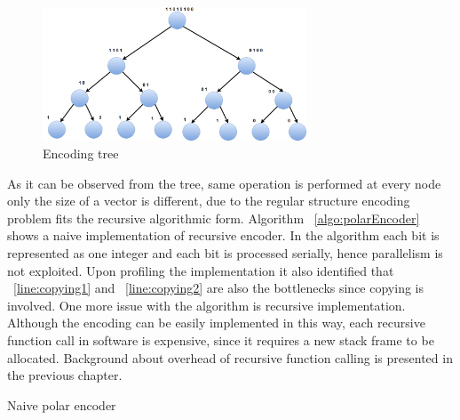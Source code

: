 \begin{figure}[]
	\centering
	\includegraphics[width=0.7\textwidth]{./figures/treeEncoding.pdf}
	\caption{Encoding tree}
	\label{fig:treeEncoding}
\end{figure}

As it can be observed from the tree, same operation is performed at every node only the size of a vector is different, due to the regular structure encoding problem fits the recursive algorithmic form. Algorithm ~\ref{algo:polarEncoder} shows a naive implementation of recursive encoder. In the algorithm each bit is represented as one integer and each bit is processed serially, hence parallelism is not exploited. Upon profiling the implementation it also identified that ~\ref{line:copying1} and ~\ref{line:copying2} are also the bottlenecks since copying is involved. One more issue with the algorithm is recursive implementation. Although the encoding can be easily implemented in this way, each recursive function call in software is expensive, since it requires a new stack frame to be allocated. Background about overhead of recursive function calling is presented in the previous chapter.

\IncMargin{1.5em}
\begin{algorithm}[!h]
	\caption{Naive polar encoder}
	\label{algo:polarEncoder}	
\end{algorithm}
\DecMargin{1.5em}

